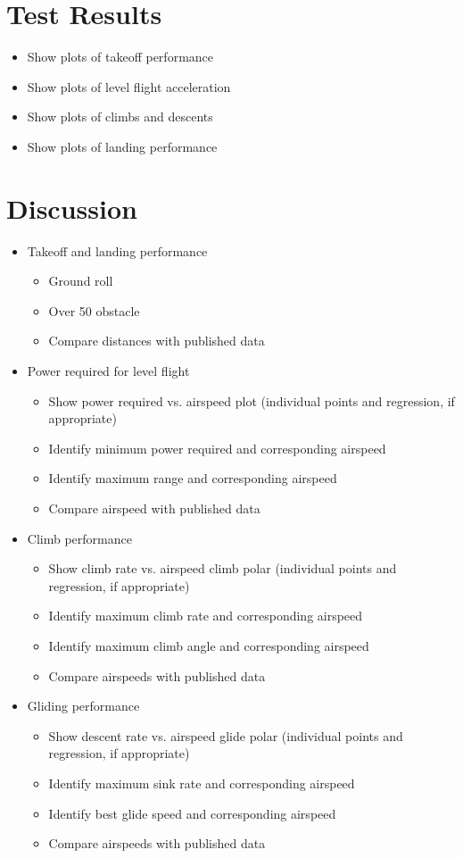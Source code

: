 \documentclass[conf]{new-aiaa}
\begin{document}
\section{Test Results}

\begin{itemize}
	\item Show plots of takeoff performance
	\item Show plots of level flight acceleration
	\item Show plots of climbs and descents
	\item Show plots of landing performance
\end{itemize}

\section{Discussion}

\begin{itemize}
	\item Takeoff and landing performance
	\begin{itemize}
		\item Ground roll
		\item Over \SI{50}{\foot} obstacle
		\item Compare distances with published data
	\end{itemize}
	\item Power required for level flight
	\begin{itemize}
		\item Show power required vs. airspeed plot (individual points and regression, if appropriate)
		\item Identify minimum power required and corresponding airspeed
		\item Identify maximum range and corresponding airspeed
		\item Compare airspeed with published data
	\end{itemize}
	\item Climb performance
	\begin{itemize}
		\item Show climb rate vs. airspeed climb polar (individual points and regression, if appropriate)
		\item Identify maximum climb rate and corresponding airspeed
		\item Identify maximum climb angle and corresponding airspeed
		\item Compare airspeeds with published data
	\end{itemize}
	\item Gliding performance
	\begin{itemize}
		\item Show descent rate vs. airspeed glide polar (individual points and regression, if appropriate)
		\item Identify maximum sink rate and corresponding airspeed
		\item Identify best glide speed and corresponding airspeed
		\item Compare airspeeds with published data
	\end{itemize}
\end{itemize}
\end{document}
